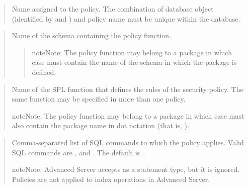 \documentclass[letterpaper,10pt,english,openany,oneside]{sphinxmanual}
\begin{document}
\begin{quote}

Name assigned to the policy. The combination of database object
(identified by  and ) and policy name must
be unique within the database.
\end{quote}

\begin{quote}

Name of the schema containing the policy function.
\begin{quote}

\begin{sphinxadmonition}{note}{Note:}
The policy function may belong to a package in which case  must contain the name of the schema in which the package is defined.
\end{sphinxadmonition}
\end{quote}
\end{quote}

\begin{quote}

Name of the SPL function that defines the rules of the security policy.
The same function may be specified in more than one policy.

\begin{sphinxadmonition}{note}{Note:}
The policy function may belong to a package in which case  must also contain the package name in dot notation (that is, ).
\end{sphinxadmonition}
\end{quote}

\newpage

\begin{quote}

Comma-separated list of SQL commands to which the policy applies. Valid
SQL commands are , and . The default is
.

\begin{sphinxadmonition}{note}{Note:}
Advanced Server accepts  as a statement type, but it is ignored. Policies are not applied to index operations in Advanced Server.
\end{sphinxadmonition}
\end{quote}
\end{document}
